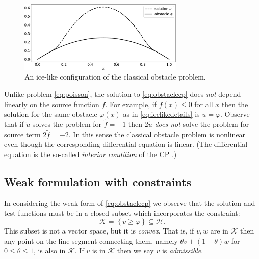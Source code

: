 \documentclass[letterpaper,final,12pt,reqno]{amsart}
\theoremstyle{claim}
\numberwithin{equation}{section}
\numberwithin{figure}{section}
\numberwithin{table}{section}
\numberwithin{theorem}{section}
\begin{document}
\begin{figure}
\includegraphics[width=0.7\textwidth]{fixfigs/icelike.pdf}
\caption{An ice-like configuration of the classical obstacle problem.}
\label{fig:icelike}
\end{figure}

Unlike problem \eqref{eq:poisson}, the solution to \eqref{eq:obstaclecp} does \emph{not} depend linearly on the source function $f$.  For example, if $f(x)\le 0$ for all $x$ then the solution for the same obstacle $\varphi(x)$ as in \eqref{eq:icelikedetails} is $u=\varphi$.  Observe that if $\tilde u$ solves the problem for $\tilde f= -1$ then $2\tilde u$ \emph{does not} solve the problem for source term $2\tilde f = -2$.  In this sense the classical obstacle problem is nonlinear even though the corresponding differential equation is linear.  (The differential equation is the so-called \emph{interior condition} of the CP \cite{KinderlehrerStampacchia1980}.)

\subsection*{Weak formulation with constraints}  In considering the weak form of \eqref{eq:obstaclecp} we observe that the solution and test functions must be in a closed subset which incorporates the constraint:
\begin{equation}
\mathcal{K} = \left\{v \ge \varphi\right\} \subseteq \mathcal{H}.  \label{eq:Kdefine}
\end{equation}
This subset is not a vector space, but it is \emph{convex}.  That is, if $v,w$ are in $\mathcal{K}$ then any point on the line segment connecting them, namely $\theta v + (1-\theta) w$ for $0 \le \theta \le 1$, is also in $\mathcal{K}$.  If $v$ is in $\mathcal{K}$ then we say $v$ is \emph{admissible}.
\end{document}
